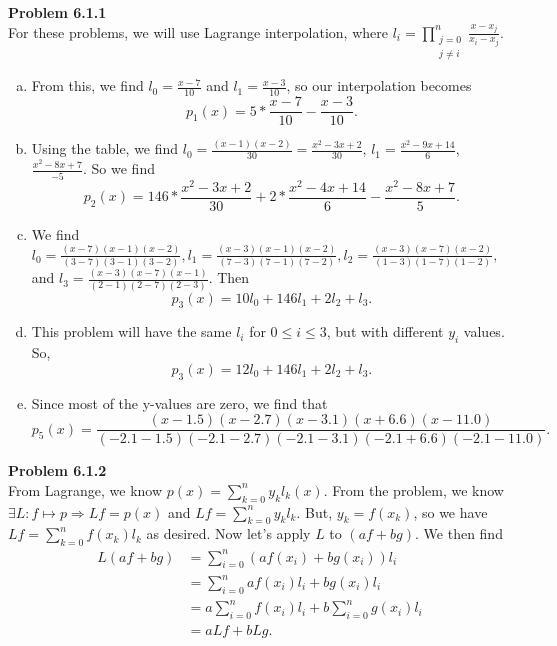 \documentclass{article}
\newcommand{\Problem}[1]{\textbf{Problem #1}}
\begin{document}
\Problem{6.1.1}\\

For these problems, we will use Lagrange interpolation, where $l_i = \displaystyle\prod_{\substack{j = 0 \\ j \neq i}}^n \frac{x - x_j}{x_i-x_j}$.
\begin{enumerate}[a.]

\item From this, we find $l_0 = \frac{x-7}{10}$ and $l_1 = \frac{x-3}{10}$, so our interpolation becomes 
\begin{equation*}
p_1(x) = 5*\frac{x-7}{10} - \frac{x-3}{10}.
\end{equation*}

\item Using the table, we find $l_0 = \frac{(x-1)(x-2)}{30} = \frac{x^2-3x+2}{30}$, $l_1 = \frac{x^2-9x+14}{6}$, $\frac{x^2-8x+7}{-5}$. 
So we find 
\begin{equation*}
p_2(x) = 146*\frac{x^2-3x+2}{30} + 2*\frac{x^2-4x+14}{6} - \frac{x^2-8x+7}{5}.
\end{equation*}

\item We find $l_0 = \frac{(x-7)(x-1)(x-2)}{(3-7)(3-1)(3-2)}, l_1 = \frac{(x-3)(x-1)(x-2)}{(7-3)(7-1)(7-2)}, l_2 = \frac{(x-3)(x-7)(x-2)}{(1-3)(1-7)(1-2)},$ and $l_3 = \frac{(x-3)(x-7)(x-1)}{(2-1)(2-7)(2-3)}$.
Then
\begin{equation*}
p_3(x) = 10l_0 + 146l_1 + 2l_2 + l_3.
\end{equation*}

\item This problem will have the same $l_i$ for $0 \leq i \leq 3$, but with different $y_i$ values.
So,
\begin{equation*}
p_3(x) = 12l_0 + 146l_1 + 2l_2 + l_3.
\end{equation*}

\item Since most of the y-values are zero, we find that
\begin{equation*}
p_5(x) = \frac{(x-1.5)(x-2.7)(x-3.1)(x+6.6)(x-11.0)}{(-2.1-1.5)(-2.1-2.7)(-2.1-3.1)(-2.1+6.6)(-2.1-11.0)}.
\end{equation*}

\end{enumerate}

\Problem{6.1.2}\\

From Lagrange, we know $p(x) = \sum_{k = 0}^n y_kl_k(x)$. 
From the problem, we know $\exists L:f\mapsto p \Rightarrow Lf = p(x)$ and $Lf = \sum_{k = 0}^n y_kl_k$.
But, $y_k = f(x_k)$, so we have $Lf = \sum_{k = 0}^n f(x_k)l_k$ as desired.
Now let's apply $L$ to $(af + bg)$. 
We then find
\begin{align*}
L(af + bg) &= \displaystyle\sum_{i = 0}^n (af(x_i) + bg(x_i))l_i\\
&= \displaystyle\sum_{i = 0}^n af(x_i)l_i + bg(x_i)l_i\\
&= a\displaystyle\sum_{i = 0}^n f(x_i)l_i + b\displaystyle\sum_{i = 0}^n g(x_i)l_i\\
&= aLf + bLg.
\end{align*}\\
\end{document}
